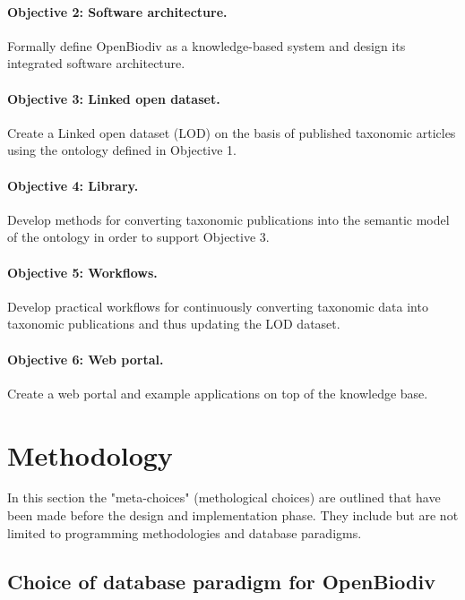 \paragraph{Objective 2: Software architecture.} Formally define OpenBiodiv as a knowledge-based system and design its integrated software architecture.

\paragraph{Objective 3: Linked open dataset.} Create a Linked open dataset (LOD) on the basis of published taxonomic articles using the ontology defined in Objective 1.

\paragraph{Objective 4: Library.} Develop methods for converting taxonomic publications into the semantic model of the ontology in order to support Objective 3.

\paragraph{Objective 5: Workflows.} Develop practical workflows for continuously converting taxonomic data into taxonomic publications and thus updating the LOD dataset.

\paragraph{Objective 6: Web portal.} Create a web portal and example applications on top of the knowledge base.

\section*{Methodology}

In this section the "meta-choices" (methological choices) are outlined that have been made before the design and implementation phase. They include but are not limited to programming methodologies and database paradigms. 

\subsection*{Choice of database paradigm for OpenBiodiv}

